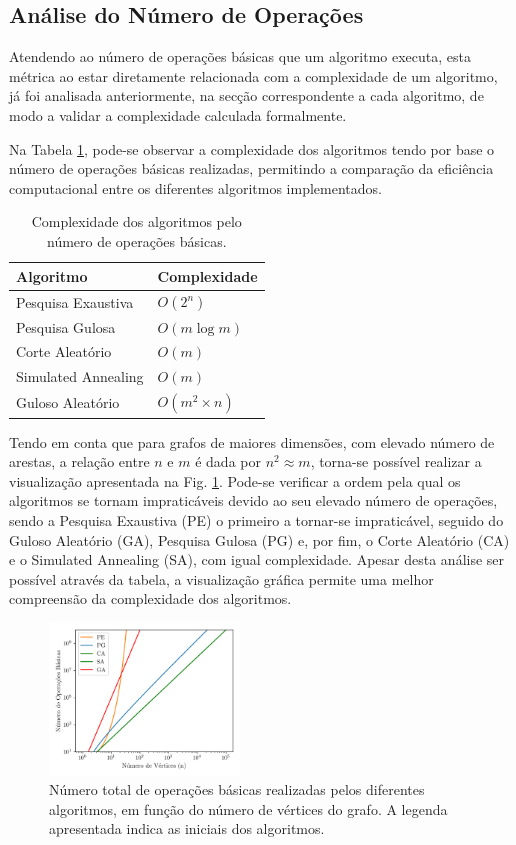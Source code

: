 \documentclass[mirror, portugues]{revdetua}
\begin{document}
\subsection{Análise do Número de Operações}

Atendendo ao número de operações básicas que um algoritmo executa, esta métrica ao estar diretamente relacionada com a complexidade de um algoritmo, já foi analisada anteriormente, na secção correspondente a cada algoritmo, de modo a validar a complexidade calculada formalmente.

Na Tabela \ref{table:numops}, pode-se observar a complexidade dos algoritmos tendo por base o número de operações básicas realizadas, permitindo a comparação da eficiência computacional entre os diferentes algoritmos implementados.

\begin{table}[H]
\centering
\caption{Complexidade dos algoritmos pelo número de operações básicas.}
\label{table:numops}
\begin{tabular}{ll}
\toprule
\textbf{Algoritmo} & \textbf{Complexidade} \\
\midrule
Pesquisa Exaustiva & $O(2^n)$ \\
Pesquisa Gulosa & $O(m \log m)$ \\
Corte Aleatório & $O(m)$ \\
Simulated Annealing & $O(m)$ \\
Guloso Aleatório & $O(m^2 \times n)$ \\
\bottomrule
\end{tabular}
\end{table}

Tendo em conta que para grafos de maiores dimensões, com elevado número de arestas, a relação entre $n$ e $m$ é dada por $n^2 \approx m$, torna-se possível realizar a visualização apresentada na Fig. \ref{fig:total_ops_per_alg}. Pode-se verificar a ordem pela qual os algoritmos se tornam impraticáveis devido ao seu elevado número de operações, sendo a Pesquisa Exaustiva (PE) o primeiro a tornar-se impraticável, seguido do Guloso Aleatório (GA), Pesquisa Gulosa (PG) e, por fim, o Corte Aleatório (CA) e o Simulated Annealing (SA), com igual complexidade. Apesar desta análise ser possível através da tabela, a visualização gráfica permite uma melhor compreensão da complexidade dos algoritmos.

\begin{figure}[H]
    \centering
    \includegraphics[width=0.45\textwidth]{../assets/basicops.png}
    \caption{Número total de operações básicas realizadas pelos diferentes algoritmos, em função do número de vértices do grafo. A legenda apresentada indica as iniciais dos algoritmos.}
    \label{fig:total_ops_per_alg}
\end{figure}
\end{document}
